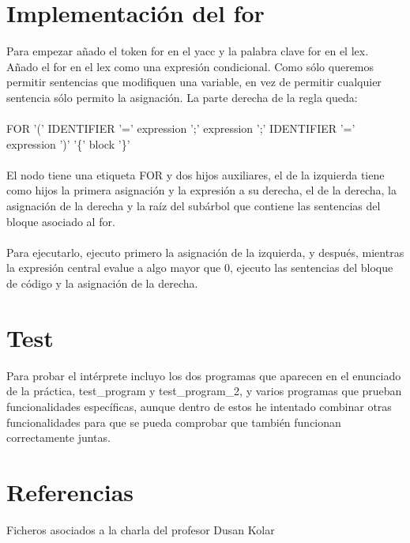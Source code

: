 \documentclass{article}
\begin{document}
\section{Implementación del for}
Para empezar añado el token for en el yacc y la palabra clave for en el lex.\\
Añado el for en el lex como una expresión condicional. Como sólo queremos permitir sentencias que modifiquen una variable, en vez de permitir cualquier sentencia sólo permito la asignación. La parte derecha de la regla queda:\\\\
FOR '(' IDENTIFIER '=' expression ';' expression ';' IDENTIFIER '=' expression ')' '\{' block '\}'\\\\
El nodo tiene una etiqueta FOR y dos hijos auxiliares, el de la izquierda tiene como hijos la primera asignación y la expresión a su derecha, el de la derecha, la asignación de la derecha y la raíz del subárbol que contiene las sentencias del bloque asociado al for.\\\\
Para ejecutarlo, ejecuto primero la asignación de la izquierda, y después, mientras la expresión central evalue a algo mayor que 0, ejecuto las sentencias del bloque de código y la asignación de la derecha.

\section{Test}
Para probar el intérprete incluyo los dos programas que aparecen en el enunciado de la práctica, test\_program y test\_program\_2, y varios programas que prueban funcionalidades específicas, aunque dentro de estos he intentado combinar otras funcionalidades para que se pueda comprobar que también funcionan correctamente juntas.

\section{Referencias}
Ficheros asociados a la charla del profesor Dusan Kolar
\end{document}

